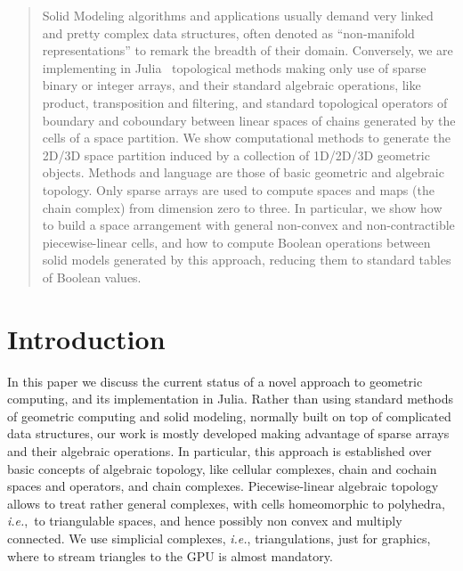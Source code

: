 \documentclass{juliacon}
\begin{document}


\maketitle

\begin{abstract}
Solid Modeling algorithms and applications usually demand very linked and pretty complex data structures, often denoted as ``non-manifold representations'' to remark the breadth of their domain. Conversely, we are implementing in Julia~\cite{bezanson2017julia} topological methods making only use of sparse binary or integer arrays, and their standard algebraic operations, like product, transposition and filtering, and standard topological operators of boundary and coboundary between linear spaces of chains generated by the cells of a space partition. 
We show computational methods to generate the 2D/3D space partition induced by a collection of 1D/2D/3D geometric objects. Methods and language are those of basic geometric and algebraic topology. Only sparse arrays are used to compute spaces and maps (the chain complex) from dimension zero to three.
In particular, we show how to build a space arrangement with general non-convex and non-contractible piecewise-linear cells, and how to compute Boolean operations between solid models generated by this approach, reducing them to standard tables of Boolean values.
\end{abstract}

\section{Introduction}

In this paper we discuss the current status of a novel approach to geometric computing, and its  implementation in Julia. Rather than using standard methods of geometric computing and solid modeling, normally built on top of complicated data structures, our work is mostly developed making advantage of    sparse arrays and their algebraic operations. In particular, this approach is established over basic concepts of algebraic topology, like cellular complexes, chain and cochain spaces and operators, and chain complexes.  Piecewise-linear algebraic topology allows to treat rather general complexes, with cells homeomorphic to polyhedra, \emph{i.e.},~to triangulable spaces, and hence possibly non convex and multiply connected. We use simplicial complexes, \emph{i.e.}, triangulations, just for graphics, where to stream triangles to the GPU is almost mandatory. 
\end{document}
